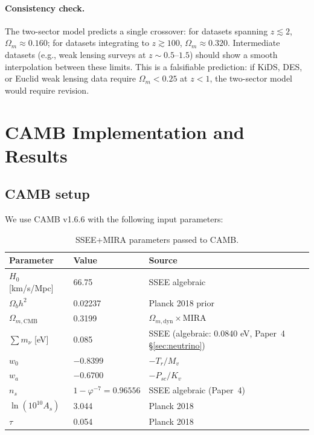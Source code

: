 \documentclass[12pt,a4paper]{article}
\begin{document}
\paragraph{Consistency check.}
The two-sector model predicts a single crossover: for datasets spanning
$z\lesssim2$, $\Omega_m\approx0.160$; for datasets integrating to $z\gtrsim100$,
$\Omega_m\approx0.320$.
Intermediate datasets (e.g., weak lensing surveys at $z\sim0.5$--$1.5$) should
show a smooth interpolation between these limits.
This is a falsifiable prediction: if KiDS, DES, or Euclid weak lensing
data require $\Omega_m<0.25$ at $z<1$, the two-sector model would require revision.

\section{CAMB Implementation and Results}
\label{sec:results}

\subsection{CAMB setup}

We use CAMB v1.6.6 \citep{Lewis2000,Howlett2012} with the following input parameters:

\begin{table}[ht]
\centering
\caption{SSEE+MIRA parameters passed to CAMB.}
\label{tab:camb_params}
\begin{tabular}{lll}
\toprule
Parameter & Value & Source \\
\midrule
$H_0$ [km/s/Mpc] & 66.75 & SSEE algebraic \\
$\Omega_b h^2$ & 0.02237 & Planck 2018 prior \\
$\Omega_{m,\mathrm{CMB}}$ & 0.3199 & $\Omega_{m,\mathrm{dyn}}\times\mathrm{MIRA}$ \\
$\sum m_\nu$ [eV] & 0.085 & SSEE (algebraic: 0.0840 eV, Paper~4 \S\ref{sec:neutrino}) \\
$w_0$ & $-0.8399$ & $-T_r/M_v$ \\
$w_a$ & $-0.6700$ & $-P_{sc}/K_v$ \\
$n_s$ & $1-\varphi^{-7}=0.96556$ & SSEE algebraic (Paper~4) \\
$\ln(10^{10}A_s)$ & 3.044 & Planck 2018 \\
$\tau$ & 0.054 & Planck 2018 \\
\bottomrule
\end{tabular}
\end{table}
\end{document}
